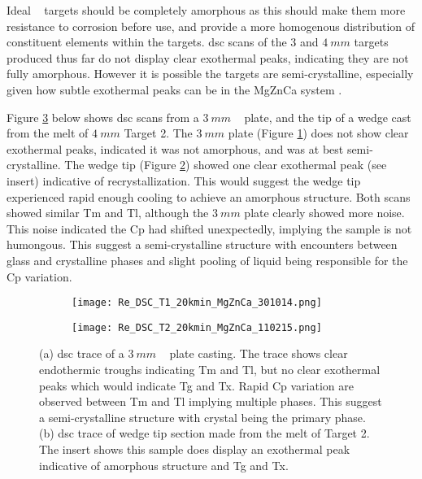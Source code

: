 \documentclass[a4paper,12pt,oneside]{report}%
\begin{document}
Ideal \MgZnCa~ targets should be completely amorphous as this should make them more resistance to corrosion before use, and provide a more homogenous distribution of constituent elements within the targets. \Gls{dsc} scans of the $3$ and $4~ mm$ targets produced thus far do not display clear exothermal peaks, indicating they are not fully amorphous. However it is possible the targets are semi-crystalline, especially given how subtle exothermal peaks can be in the MgZnCa system \cite{Gu2010}. 

Figure \ref{fig:DSCTarget1n2} below shows \gls{dsc} scans from a $3~ mm$ \MgZnCa~ plate, and the tip of a wedge cast from the melt of $4~ mm$ Target 2. The $3~ mm$ plate (Figure \ref{fig:DSCTarget1}) does not show clear exothermal peaks, indicated it was not amorphous, and was at best semi-crystalline. The wedge tip (Figure \ref{fig:DSCTarget2}) showed one clear exothermal peak (see insert) indicative of recrystallization. This would suggest the wedge tip experienced rapid enough cooling to achieve an amorphous structure. Both scans showed similar \gls{Tm} and \gls{Tl}, although the $3~ mm$ plate clearly showed more noise. This noise indicated the \gls{Cp} had shifted unexpectedly, implying the sample is not humongous. This suggest a semi-crystalline structure with encounters between glass and crystalline phases and slight pooling of liquid being responsible for the \gls{Cp} variation.

\begin{figure}[htbp]
	\centering
	\begin{subfigure}[htbp]{0.49\textwidth}
		\texttt{[image: Re\_DSC\_T1\_20kmin\_MgZnCa\_301014.png]}
		\caption{}
		\label{fig:DSCTarget1}
	\end{subfigure}
	\begin{subfigure}[htbp]{0.49\textwidth}
		\texttt{[image: Re\_DSC\_T2\_20kmin\_MgZnCa\_110215.png]}
		\caption{}
		\label{fig:DSCTarget2}
	\end{subfigure}
	\caption{(a) \acrshort{dsc} trace of a $3~ mm$ \MgZnCa~ plate casting. The trace shows clear endothermic troughs indicating \acrshort{Tm} and \acrshort{Tl}, but no clear exothermal peaks which would indicate \acrshort{Tg} and \acrshort{Tx}. Rapid \acrshort{Cp} variation are observed between \acrshort{Tm} and \acrshort{Tl} implying multiple phases. This suggest a semi-crystalline structure with crystal being the primary phase. (b) \acrshort{dsc} trace of wedge tip section made from the melt of Target 2. The insert shows this sample does display an exothermal peak indicative of amorphous structure and \acrshort{Tg} and \acrshort{Tx}.}%
	\label{fig:DSCTarget1n2}
\end{figure}
\end{document}
